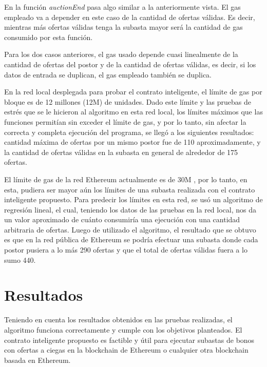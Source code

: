         En la función \textit{auctionEnd} pasa algo similar a la anteriormente vista. El gas empleado va a 
        depender en este caso de la cantidad de ofertas válidas. Es decir, mientras más ofertas válidas tenga 
        la subasta mayor será la cantidad de gas consumido por esta función.
  
  
        Para los dos casos anteriores, el gas usado depende cuasi linealmente de la cantidad de ofertas del 
        postor y de la cantidad de ofertas válidas, es decir, si los datos de entrada se duplican, el gas 
        empleado también se duplica.
  
  
        En la red local desplegada para probar el contrato inteligente, el límite de gas por bloque es de 
        12 millones (12M) de unidades. Dado este límite y las pruebas de estrés que se le hicieron al 
        algoritmo en esta red local, los límites máximos que las funciones permitían sin exceder el límite
        de gas, y por lo tanto, sin afectar la correcta y completa ejecución del programa, se llegó a los
        siguientes resultados: cantidad máxima de ofertas por un mismo postor fue de 110 aproximadamente,
        y la cantidad de ofertas válidas en la subasta en general de alrededor de 175 ofertas.
  
  
        El límite de gas de la red Ethereum actualmente es de 30M \parencite{ycharts}, por lo tanto, en esta,
        pudiera ser mayor aún los límites de una subasta realizada con el contrato inteligente propuesto.
        Para predecir los límites en esta red, se usó un algoritmo de regresión lineal, el cual, teniendo 
        los datos de las pruebas en la red local, nos da un valor aproximado de cuánto consumiría una 
        ejecución con una cantidad arbitraria de ofertas. Luego de utilizado el algoritmo, el resultado que 
        se obtuvo es que en la red pública de Ethereum se podría efectuar una subasta donde cada postor 
        pusiera a lo más 290 ofertas y que el total de ofertas válidas fuera a lo sumo 440.

    \section{Resultados}
      Teniendo en cuenta los resultados obtenidos en las pruebas realizadas, el algoritmo funciona 
      correctamente y cumple con los objetivos planteados. El contrato inteligente propuesto es factible y 
      útil para ejecutar
      subastas de bonos con ofertas a ciegas en la blockchain de Ethereum o cualquier otra blockchain 
      basada en Ethereum.
  
